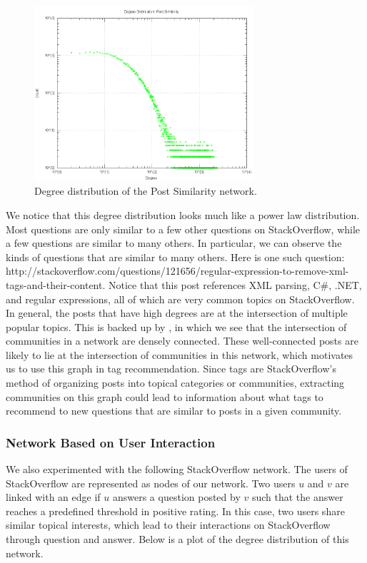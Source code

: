 \documentclass[10pt]{IEEEtran}
\begin{document}
\begin{figure}[h]
  \centering
    \includegraphics[width=3.2in]{similarity_degdistr.png}
  \caption{Degree distribution of the Post Similarity network.}
  \label{fig:post_dd}
\end{figure}

We notice that this degree distribution looks much like a power law distribution. Most questions are only similar to a few other questions on StackOverflow, while a few questions are similar to many others. In particular, we can observe the kinds of questions that are similar to many others. Here is one such question: http://stackoverflow.com/questions/121656/regular-expression-to-remove-xml-tags-and-their-content.
Notice that this post references XML parsing, C\#, .NET, and regular expressions, all of which are very common topics on StackOverflow. In general, the posts that have high degrees are at the intersection of multiple popular topics. This is backed up by \cite{8}, in which we see that the intersection of communities in a network are densely connected. These well-connected posts are likely to lie at the intersection of communities in this network, which motivates us to use this graph in tag recommendation. Since tags are StackOverflow’s method of organizing posts into topical categories or communities, extracting communities on this graph could lead to information about what tags to recommend to new questions that are similar to posts in a given community.

\subsubsection{Network Based on User Interaction}

We also experimented with the following StackOverflow network. The users of StackOverflow are represented as nodes of our network. Two users $u$ and $v$ are linked with an edge if $u$ answers a question posted by $v$ such that the answer reaches a predefined threshold in positive rating. In this case, two users share similar topical interests, which lead to their interactions on StackOverflow through question and answer. Below is a plot of the degree distribution of this network.
\end{document}

